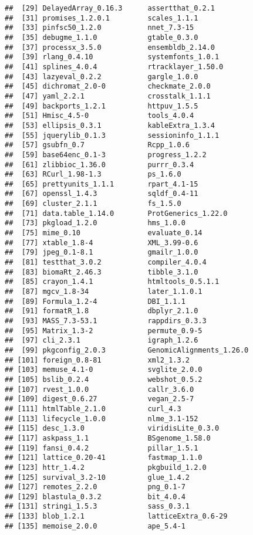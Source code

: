 \documentclass[
]{article}
\begin{document}
\begin{verbatim}
##  [29] DelayedArray_0.16.3      assertthat_0.2.1        
##  [31] promises_1.2.0.1         scales_1.1.1            
##  [33] pinfsc50_1.2.0           nnet_7.3-15             
##  [35] debugme_1.1.0            gtable_0.3.0            
##  [37] processx_3.5.0           ensembldb_2.14.0        
##  [39] rlang_0.4.10             systemfonts_1.0.1       
##  [41] splines_4.0.4            rtracklayer_1.50.0      
##  [43] lazyeval_0.2.2           gargle_1.0.0            
##  [45] dichromat_2.0-0          checkmate_2.0.0         
##  [47] yaml_2.2.1               crosstalk_1.1.1         
##  [49] backports_1.2.1          httpuv_1.5.5            
##  [51] Hmisc_4.5-0              tools_4.0.4             
##  [53] ellipsis_0.3.1           kableExtra_1.3.4        
##  [55] jquerylib_0.1.3          sessioninfo_1.1.1       
##  [57] gsubfn_0.7               Rcpp_1.0.6              
##  [59] base64enc_0.1-3          progress_1.2.2          
##  [61] zlibbioc_1.36.0          purrr_0.3.4             
##  [63] RCurl_1.98-1.3           ps_1.6.0                
##  [65] prettyunits_1.1.1        rpart_4.1-15            
##  [67] openssl_1.4.3            sqldf_0.4-11            
##  [69] cluster_2.1.1            fs_1.5.0                
##  [71] data.table_1.14.0        ProtGenerics_1.22.0     
##  [73] pkgload_1.2.0            hms_1.0.0               
##  [75] mime_0.10                evaluate_0.14           
##  [77] xtable_1.8-4             XML_3.99-0.6            
##  [79] jpeg_0.1-8.1             gmailr_1.0.0            
##  [81] testthat_3.0.2           compiler_4.0.4          
##  [83] biomaRt_2.46.3           tibble_3.1.0            
##  [85] crayon_1.4.1             htmltools_0.5.1.1       
##  [87] mgcv_1.8-34              later_1.1.0.1           
##  [89] Formula_1.2-4            DBI_1.1.1               
##  [91] formatR_1.8              dbplyr_2.1.0            
##  [93] MASS_7.3-53.1            rappdirs_0.3.3          
##  [95] Matrix_1.3-2             permute_0.9-5           
##  [97] cli_2.3.1                igraph_1.2.6            
##  [99] pkgconfig_2.0.3          GenomicAlignments_1.26.0
## [101] foreign_0.8-81           xml2_1.3.2              
## [103] memuse_4.1-0             svglite_2.0.0           
## [105] bslib_0.2.4              webshot_0.5.2           
## [107] rvest_1.0.0              callr_3.6.0             
## [109] digest_0.6.27            vegan_2.5-7             
## [111] htmlTable_2.1.0          curl_4.3                
## [113] lifecycle_1.0.0          nlme_3.1-152            
## [115] desc_1.3.0               viridisLite_0.3.0       
## [117] askpass_1.1              BSgenome_1.58.0         
## [119] fansi_0.4.2              pillar_1.5.1            
## [121] lattice_0.20-41          fastmap_1.1.0           
## [123] httr_1.4.2               pkgbuild_1.2.0          
## [125] survival_3.2-10          glue_1.4.2              
## [127] remotes_2.2.0            png_0.1-7               
## [129] blastula_0.3.2           bit_4.0.4               
## [131] stringi_1.5.3            sass_0.3.1              
## [133] blob_1.2.1               latticeExtra_0.6-29     
## [135] memoise_2.0.0            ape_5.4-1
\end{verbatim}
\end{document}
